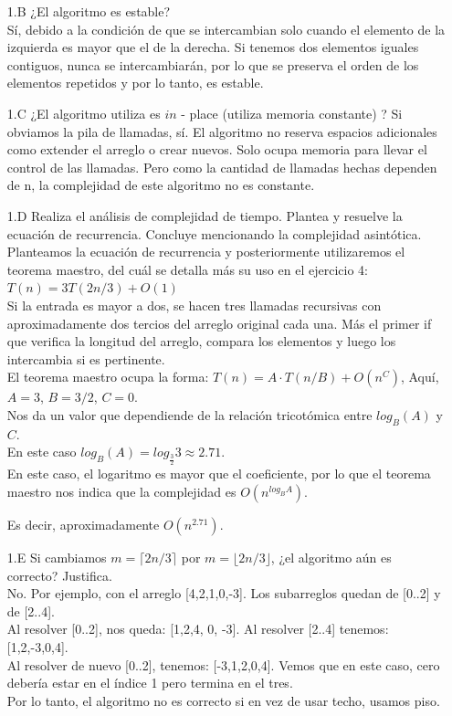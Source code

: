 \documentclass[12pt]{article}
\begin{document}
\begin{itemize}
    \item[1.B] ¿El algoritmo es estable?\\
    Sí, debido a la condición de que se intercambian solo cuando el elemento de la izquierda es mayor que el de la derecha.
    Si tenemos dos elementos iguales contiguos, nunca se intercambiarán, por lo que se preserva el orden de los elementos repetidos y por lo tanto, es estable.
    \item[1.C] ¿El algoritmo utiliza es $in$ - place (utiliza memoria constante) ?
    Si obviamos la pila de llamadas, sí. El algoritmo no reserva espacios adicionales como extender el arreglo o crear nuevos. Solo ocupa memoria para llevar el control de las llamadas. Pero como la cantidad de llamadas hechas dependen de n, la complejidad de este algoritmo no es constante.
    \item[1.D] Realiza el análisis de complejidad de tiempo. Plantea y resuelve la ecuación de recurrencia. Concluye mencionando la complejidad asintótica.\\
    Planteamos la ecuación de recurrencia y posteriormente utilizaremos el teorema maestro, del cuál se detalla más su uso en el ejercicio 4:\\
    $T(n) = 3T(2n/3) + O(1)$\\ Si la entrada es mayor a dos, se hacen tres llamadas recursivas con aproximadamente dos tercios del arreglo original cada una. Más el primer if que verifica la longitud del arreglo, compara los elementos y luego los intercambia si es pertinente.\\
    El teorema maestro ocupa la forma: $T(n) = A \cdot T(n/B) + O(n^C)$, Aquí, $A = 3$, $B = 3 / 2$, $C = 0$.\\
    Nos da un valor que dependiende de la relación tricotómica entre $log_B(A)$ y $C$.\\
    En este caso $log_B(A) = log_\frac{3}{2}3 \approx 2.71$.\\
    En este caso, el logaritmo es mayor que el coeficiente, por lo que el teorema maestro nos indica que la complejidad es $O(n^{log_BA})$.

    Es decir, aproximadamente $O(n^{2.71})$.
    \item[1.E] Si cambiamos $m = \lceil 2n/3 \rceil$ por $m = \lfloor 2n/3 \rfloor$, ¿el algoritmo aún es correcto? Justifica.\\
    No. Por ejemplo, con el arreglo [4,2,1,0,-3]. Los subarreglos quedan de [0..2] y de [2..4].\\
    Al resolver [0..2], nos queda: [1,2,4, 0, -3]. Al resolver [2..4] tenemos: [1,2,-3,0,4].\\
    Al resolver de nuevo [0..2], tenemos: [-3,1,2,0,4]. Vemos que en este caso, cero debería estar en el índice 1 pero termina en el tres.\\
    Por lo tanto, el algoritmo no es correcto si en vez de usar techo, usamos piso.
\end{itemize}
\end{document}
